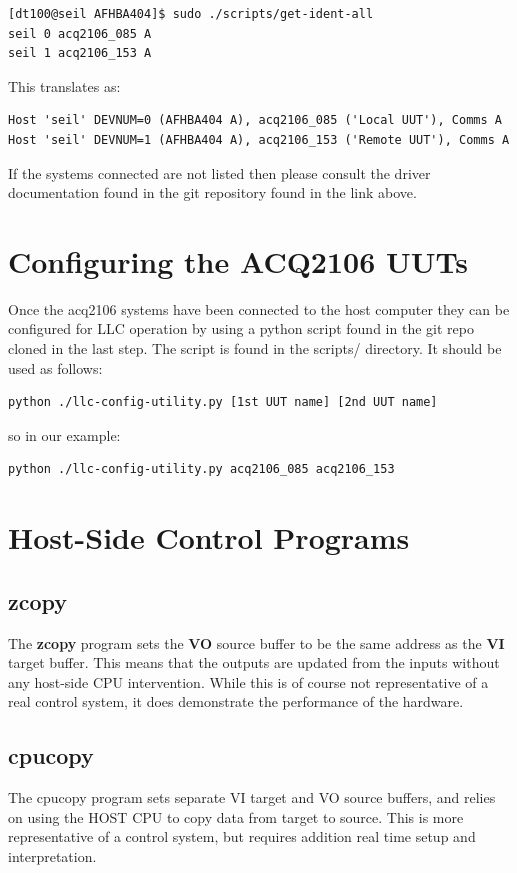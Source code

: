\documentclass{article}
\begin{document}
\begin{verbatim}
[dt100@seil AFHBA404]$ sudo ./scripts/get-ident-all 
seil 0 acq2106_085 A
seil 1 acq2106_153 A
\end{verbatim}

This translates as:
\begin{verbatim}
Host 'seil' DEVNUM=0 (AFHBA404 A), acq2106_085 ('Local UUT'), Comms A
Host 'seil' DEVNUM=1 (AFHBA404 A), acq2106_153 ('Remote UUT'), Comms A
\end{verbatim}

If the systems connected are not listed then please consult the driver documentation found in the git repository found in the link above.

\section{Configuring the ACQ2106 UUTs}\label{configure2106s}
Once the acq2106 systems have been connected to the host computer they can be configured for LLC operation by using a python script found in the git repo cloned in the last step.
The script is found in the scripts/ directory.
It should be used as follows:
\begin{verbatim}
python ./llc-config-utility.py [1st UUT name] [2nd UUT name]
\end{verbatim}

so in our example:

\begin{verbatim}
python ./llc-config-utility.py acq2106_085 acq2106_153
\end{verbatim}

\section{Host-Side Control Programs} \label{controlprogs}

\subsection{zcopy}

The \textbf{zcopy} program sets the \textbf{VO} source buffer to be the same address as the \textbf{VI} target buffer.
This means that the outputs are updated from the inputs without any host-side CPU intervention.
While this is of course not representative of a real control system, it does demonstrate the performance of the hardware.

\subsection{cpucopy}
The cpucopy program sets separate VI target and VO source buffers, and relies on using the HOST CPU to copy data from target to source.
This is more representative of a control system, but requires addition real time setup and interpretation.
\end{document}
